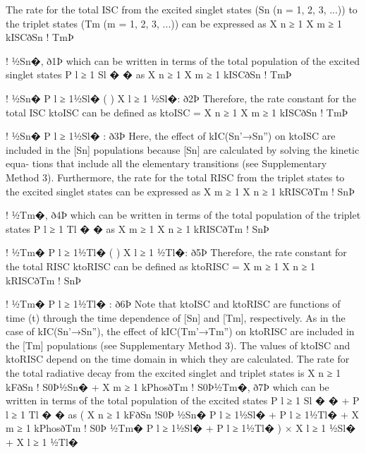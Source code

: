 The rate for the total ISC from the excited singlet states (Sn (n = 1,
2, 3, ...)) to the triplet states (Tm (m = 1, 2, 3, ...)) can be expressed as
X
n ≥ 1
X
m ≥ 1
kISCðSn ! TmÞ
 
!
½Sn�,
ð1Þ
which can be written in terms of the total population of the excited
singlet states P
l ≥ 1 Sl
�
�
as
X
n ≥ 1
X
m ≥ 1
kISCðSn ! TmÞ
 
!
½Sn�
P
l ≥ 1½Sl�
(
) X
l ≥ 1
½Sl�:
ð2Þ
Therefore, the rate constant for the total ISC ktoISC can be deﬁned
as
ktoISC =
X
n ≥ 1
X
m ≥ 1
kISCðSn ! TmÞ
 
!
½Sn�
P
l ≥ 1½Sl� :
ð3Þ
Here, the effect of kIC(Sn’→Sn”) on ktoISC are included in the [Sn]
populations because [Sn] are calculated by solving the kinetic equa-
tions that include all the elementary transitions (see Supplementary
Method 3).
Furthermore, the rate for the total RISC from the triplet states to
the excited singlet states can be expressed as
X
m ≥ 1
X
n ≥ 1
kRISCðTm ! SnÞ
 
!
½Tm�,
ð4Þ
which can be written in terms of the total population of the triplet
states P
l ≥ 1 Tl
�
�
as
X
m ≥ 1
X
n ≥ 1
kRISCðTm ! SnÞ
 
!
½Tm�
P
l ≥ 1½Tl�
(
) X
l ≥ 1
½Tl�:
ð5Þ
Therefore, the rate constant for the total RISC ktoRISC can be
deﬁned as
ktoRISC =
X
m ≥ 1
X
n ≥ 1
kRISCðTm ! SnÞ
 
!
½Tm�
P
l ≥ 1½Tl� :
ð6Þ
Note that ktoISC and ktoRISC are functions of time (t) through the
time dependence of [Sn] and [Tm], respectively. As in the case of
kIC(Sn’→Sn”), the effect of kIC(Tm’→Tm”) on ktoRISC are included in the [Tm]
populations (see Supplementary Method 3). The values of ktoISC and
ktoRISC depend on the time domain in which they are calculated. The
rate for the total radiative decay from the excited singlet and triplet
states is
X
n ≥ 1
kFðSn ! S0Þ½Sn� +
X
m ≥ 1
kPhosðTm ! S0Þ½Tm�,
ð7Þ
which can be written in terms of the total population of the
excited states P
l ≥ 1 Sl
�
�
+ P
l ≥ 1 Tl
�
�
as
( X
n ≥ 1
kFðSn !S0Þ
½Sn�
P
l ≥ 1½Sl� + P
l ≥ 1½Tl�
+
X
m ≥ 1
kPhosðTm ! S0Þ
½Tm�
P
l ≥ 1½Sl� + P
l ≥ 1½Tl�
)
×
X
l ≥ 1
½Sl� +
X
l ≥ 1
½Tl�
 
